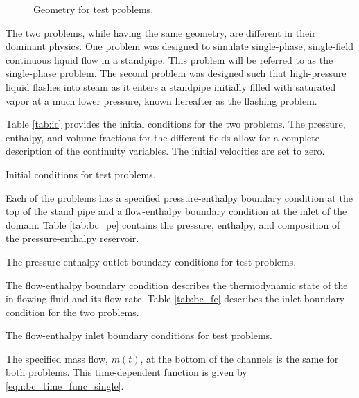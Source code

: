 \begin{figure}[h!t]
\centering

\caption{Geometry for test problems.}
\label{fig:exp_geometry}
\end{figure}

The two problems, while having the same geometry, are different in their dominant physics.
One problem was designed to simulate single-phase, single-field continuous liquid flow in a standpipe.
This problem will be referred to as the single-phase problem.
The second problem was designed such that high-pressure liquid flashes into steam as it enters a standpipe initially filled with saturated vapor at a much lower pressure, known hereafter as the flashing problem.

Table \ref{tab:ic} provides the initial conditions for the two problems.
The pressure, enthalpy, and volume-fractions for the different fields allow for a complete description of the continuity variables.
The initial velocities are set to zero.

\begin{table}[ht]
\centering

\caption{Initial conditions for test problems.}
\label{tab:ic}
\end{table}

Each of the problems has a specified pressure-enthalpy boundary condition at the top of the stand pipe and a flow-enthalpy boundary condition at the inlet of the domain.
Table \ref{tab:bc_pe} contains the pressure, enthalpy, and composition of the pressure-enthalpy reservoir. 

\begin{table}[h!t]
\centering

\caption{The pressure-enthalpy outlet boundary conditions for test problems.}
\label{tab:bc_pe}
\end{table}

The flow-enthalpy boundary condition describes the thermodynamic state of the in-flowing fluid and its flow rate.
Table \ref{tab:bc_fe} describes the inlet boundary condition for the two problems.

\begin{table}[ht]
\centering

\caption{The flow-enthalpy inlet boundary conditions for test problems.}
\label{tab:bc_fe}
\end{table}

The specified mass flow, $\dot{m}(t)$, at the bottom of the channels is the same for both problems. 
This time-dependent function is given by \eqref{eqn:bc_time_func_single}.

